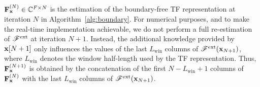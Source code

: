 ${\mathbf F}_{\mathbf x}^{(N)}\in\mathbb C^{F\times N}$ is the estimation of the boundary-free TF representation at iteration $N$ in Algorithm~\ref{alg:boundary}. For numerical purposes, and to make the real-time implementation achievable, we do not perform a full re-estimation of ${\mathscr F}^{\mathrm{ext}}$ at iteration $N+1$. Instead, the additional knowledge provided by ${\mathbf x}[N+1]$ only influences the values of the last $L_{\mathrm{win}}$ columns of ${\mathscr F}^{\mathrm{ext}}({\mathbf x}_{N+1})$, where $L_{\mathrm{win}}$ denotes the window half-length used by the TF representation. Thus, ${\mathbf F}_{\mathbf x}^{(N+1)}$ is obtained by the concatenation of the first $N-L_{\mathrm{win}}+ 1$ columns of ${\mathbf F}_{\mathbf x}^{(N)}$ with the last $L_{\mathrm{win}}$ columns of ${\mathscr F}^{\mathrm{ext}}({\mathbf x}_{N+1})$.